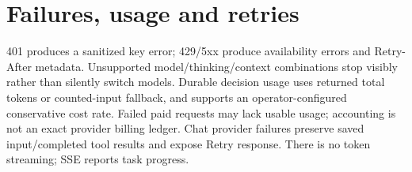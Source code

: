 \section{Failures, usage and retries}
401 produces a sanitized key error; 429/5xx produce availability errors and Retry-After metadata. Unsupported model/thinking/context combinations stop visibly rather than silently switch models. Durable decision usage uses returned total tokens or counted-input fallback, and supports an operator-configured conservative cost rate. Failed paid requests may lack usable usage; accounting is not an exact provider billing ledger. Chat provider failures preserve saved input/completed tool results and expose Retry response. There is no token streaming; SSE reports task progress.
